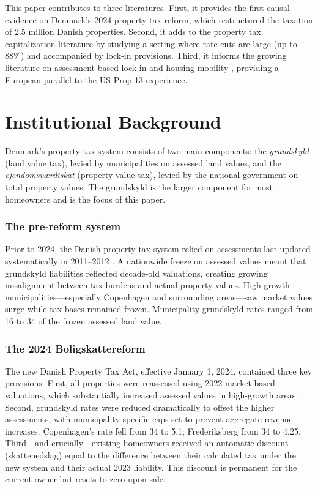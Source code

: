 \documentclass[12pt]{article}
\begin{document}
This paper contributes to three literatures. First, it provides the first causal evidence on Denmark's 2024 property tax reform, which restructured the taxation of 2.5 million Danish properties. Second, it adds to the property tax capitalization literature \citep{oates1969effects, palmon1998property, hilber2011capitalization} by studying a setting where rate cuts are large (up to 88\%) and accompanied by lock-in provisions. Third, it informs the growing literature on assessment-based lock-in and housing mobility \citep{ferreira2010you, avenancio2022california}, providing a European parallel to the US Prop 13 experience.

\section{Institutional Background}

Denmark's property tax system consists of two main components: the \textit{grundskyld} (land value tax), levied by municipalities on assessed land values, and the \textit{ejendomsv{\ae}rdiskat} (property value tax), levied by the national government on total property values. The grundskyld is the larger component for most homeowners and is the focus of this paper.

\subsubsection*{The pre-reform system} Prior to 2024, the Danish property tax system relied on assessments last updated systematically in 2011--2012 \citep{finansministeriet2017}. A nationwide freeze on assessed values meant that grundskyld liabilities reflected decade-old valuations, creating growing misalignment between tax burdens and actual property values. High-growth municipalities---especially Copenhagen and surrounding areas---saw market values surge while tax bases remained frozen. Municipality grundskyld rates ranged from 16\textperthousand{} to 34\textperthousand{} of the frozen assessed land value.

\subsubsection*{The 2024 Boligskattereform} The new Danish Property Tax Act, effective January 1, 2024, contained three key provisions. First, all properties were reassessed using 2022 market-based valuations, which substantially increased assessed values in high-growth areas. Second, grundskyld rates were reduced dramatically to offset the higher assessments, with municipality-specific caps set to prevent aggregate revenue increases. Copenhagen's rate fell from 34\textperthousand{} to 5.1\textperthousand{}; Frederiksberg from 34\textperthousand{} to 4.25\textperthousand. Third---and crucially---existing homeowners received an automatic discount (skattenedslag) equal to the difference between their calculated tax under the new system and their actual 2023 liability. This discount is permanent for the current owner but resets to zero upon sale.
\end{document}
